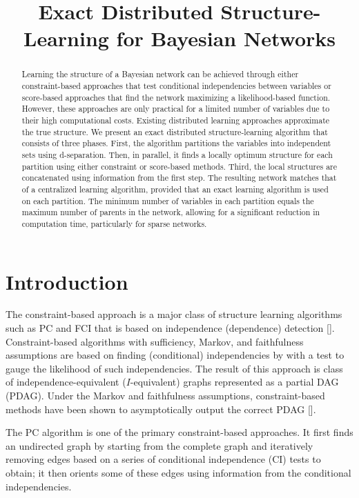 \documentclass{article}
\title{Exact Distributed Structure-Learning for Bayesian Networks}
\author{}
\begin{document}
\maketitle

\begin{abstract}
Learning the structure of a Bayesian network can be achieved through either constraint-based approaches that test conditional independencies between variables or score-based approaches that find the network maximizing a likelihood-based function. However, these approaches are only practical for a limited number of variables due to their high computational costs. Existing distributed learning approaches approximate the true structure. We present an exact distributed structure-learning algorithm that consists of three phases. First, the algorithm partitions the variables into independent sets using d-separation. Then, in parallel, it finds a locally optimum structure for each partition using either constraint or score-based methods. Third, the local structures are concatenated using information from the first step. The resulting network matches that of a centralized learning algorithm, provided that an exact learning algorithm is used on each partition. The minimum number of variables in each partition equals the maximum number of parents in the network, allowing for a significant reduction in computation time, particularly for sparse networks.
\end{abstract}

\section{Introduction}
The constraint-based approach is a major class of structure learning algorithms such as PC and FCI that is based on independence (dependence) detection []. 
Constraint-based algorithms with sufficiency, Markov, and faithfulness assumptions are based on finding (conditional) independencies by
with a test to gauge the likelihood of such independencies.
The result of this approach is class of independence-equivalent (\(I\)-equivalent) graphs represented as a partial DAG (PDAG). 
Under the Markov and faithfulness assumptions, constraint-based methods have been shown to asymptotically output the correct PDAG []. 

The PC algorithm is one of the primary constraint-based approaches.
It first finds an undirected graph by starting from the
complete graph and iteratively removing edges
based on a series of conditional independence (CI) tests to obtain; it then
orients some of these edges using information from the conditional independencies.
\end{document}
